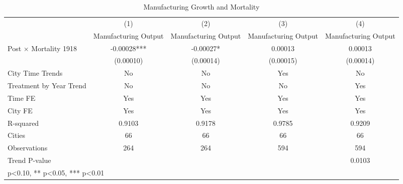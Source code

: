 \begin{table}[htbp]\centering
\def\sym#1{\ifmmode^{#1}\else\(^{#1}\)\fi}
\caption{Manufacturing Growth and Mortality}
\begin{tabular}{l*{4}{c}}
\hline\hline
                    &\multicolumn{1}{c}{(1)}   &\multicolumn{1}{c}{(2)}   &\multicolumn{1}{c}{(3)}   &\multicolumn{1}{c}{(4)}   \\
                    &Manufacturing Output   &Manufacturing Output   &Manufacturing Output   &Manufacturing Output   \\
\hline
Post $\times$ Mortality 1918&    -0.00028***&    -0.00027*  &     0.00013   &     0.00013   \\
                    &   (0.00010)   &   (0.00014)   &   (0.00015)   &   (0.00014)   \\
City Time Trends    &          No   &          No   &         Yes   &          No   \\
Treatment by Year Trend &          No   &          No   &          No   &         Yes   \\
Time FE             &         Yes   &         Yes   &         Yes   &         Yes   \\
\hline
City FE             &         Yes   &         Yes   &         Yes   &         Yes   \\
R-squared           &      0.9103   &      0.9178   &      0.9785   &      0.9209   \\
Cities              &          66   &          66   &          66   &          66   \\
Observations        &         264   &         264   &         594   &         594   \\
Trend P-value       &               &               &               &      0.0103   \\
\hline\hline
\multicolumn{5}{l}{\footnotesize * p<0.10, ** p<0.05, *** p<0.01}\\
\end{tabular}
\end{table}
